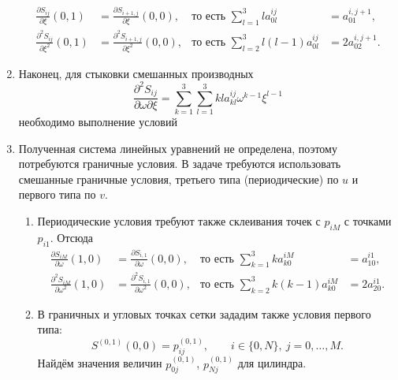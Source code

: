 \documentclass[12pt]{article}
\begin{document}
\begin{enumerate}
\begin{align*}
    \frac{\partial S_{ij}}{\partial \xi}(0, 1) &= \frac{\partial S_{i+1, j}}{\partial
    \xi}(0,0), & \text{то есть } \sum_{l=1}^3 l a_{0l}^{ij} &= a_{01}^{i, j+1},\\
      \frac{\partial^2 S_{ij}}{\partial \xi^2}(0, 1) &= \frac{\partial^2 S_{i+1,
    j}}{\partial
        \xi^2}(0,0), & \text{то есть } \sum_{l=2}^3 l(l-1) a_{0l}^{ij} &=
        2a_{02}^{i, j+1}.
  \end{align*}
\item Наконец, для стыковки смешанных производных 
\[
  \frac{\partial^2 S_{ij}}{\partial \omega \partial \xi} = \sum_{k=1}^3
  \sum_{l=1}^3 kl a^{ij}_{kl}\omega^{k-1}\xi^{l-1}
\]
необходимо выполнение условий
\item Полученная система линейных уравнений не определена, поэтому потребуются
  граничные условия. В задаче требуются использовать смешанные граничные
  условия, третьего типа (периодические)
  по $ u $ и 
  первого типа %
  по $ v $.
  \begin{enumerate}
    \item Периодические условия требуют также склеивания точек с $ p_{iM} $ с
      точками $ p_{i1} $. Отсюда  
      \begin{align*}
        \frac{\partial S_{iM}}{\partial \omega}(1, 0) &= \frac{\partial S_{i,
        1}}{\partial
          \omega}(0,0), & \text{то есть } \sum_{k=1}^3ka^{iM}_{k0} &=
          a_{10}^{i1},\\
    \frac{\partial^2 S_{iM}}{\partial \omega^2}(1, 0) &= \frac{\partial^2 S_{i, 1}}{\partial
    \omega^2}(0,0), & \text{то есть } \sum_{k=2}^3 k(k-1) a^{iM}_{k0} &=
    2a_{20}^{i1}.
      \end{align*}
     
    \item %
      В граничных и угловых точках сетки зададим также условия первого типа: 
      \[
        S^{(0, 1)}(0, 0) = p_{ij}^{(0, 1)},\qquad i\in\{0, N\}, \ j =
        0,\ldots,M.
      \]
      Найдём значения величин $ p_{0j}^{(0, 1)} $, $ p_{Nj}^{(0,1)} $ для цилиндра.
  \end{enumerate}
\end{enumerate}

\end{document}
